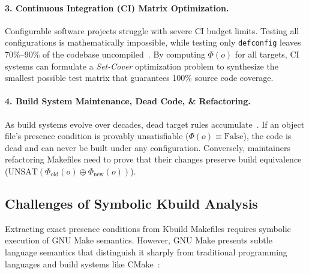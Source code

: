 \documentclass[acmsmall,screen,review]{acmart}
\begin{document}
\paragraph{3. Continuous Integration (CI) Matrix Optimization.}
Configurable software projects struggle with severe CI budget limits. Testing all configurations is mathematically impossible, while testing only \texttt{defconfig} leaves 70\%--90\% of the codebase uncompiled~\cite{medeiros2016comparison,ishimwe2021dynaplex}. By computing $\Phi(o)$ for all targets, CI systems can formulate a \emph{Set-Cover} optimization problem to synthesize the smallest possible test matrix that guarantees 100\% source code coverage.

\paragraph{4. Build System Maintenance, Dead Code, \& Refactoring.}
As build systems evolve over decades, dead target rules accumulate~\cite{tartler2011dead,passos2013coevolution,nadi2014where}. If an object file's presence condition is provably unsatisfiable ($\Phi(o) \equiv \text{False}$), the code is dead and can never be built under any configuration. Conversely, maintainers refactoring Makefiles need to prove that their changes preserve build equivalence ($\text{UNSAT}(\Phi_{\text{old}}(o) \oplus \Phi_{\text{new}}(o))$).

\subsection{Challenges of Symbolic Kbuild Analysis}
\label{sec:intro:challenges}

Extracting exact presence conditions from Kbuild Makefiles requires symbolic execution of GNU Make semantics. However, GNU Make presents subtle language semantics that distinguish it sharply from traditional programming languages and build systems like CMake~\cite{cybolic}:
\end{document}

